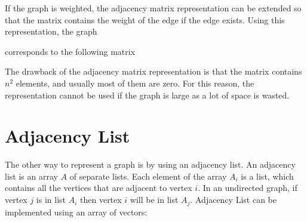 \documentclass[twoside,12pt,a4paper,english]{book}
\theoremstyle{definition}
\theoremstyle{problemstyle}
\begin{document}
If the graph is weighted, the adjacency matrix representation can be extended
so that the matrix contains the weight of the edge if the edge exists. Using this
representation, the graph

\begin{center}
\end{center}

corresponds to the following matrix

\begin{center}
\end{center}

The drawback of the adjacency matrix representation is that the matrix
contains $n^2$ elements, and usually most of them are zero. For this reason, the
representation cannot be used if the graph is large as a lot of space is wasted.

\section{Adjacency List}

The other way to represent a graph is by using an adjacency list. An adjacency list is an array $A$ of separate lists. Each element of the array $A_i$ is a list, which contains all the vertices that are adjacent to vertex $i$. In an undirected graph, if vertex $j$ is in list $A_i$ then vertex $i$ will be in list $A_j$. Adjacency List can be implemented using an array of vectors:
\end{document}
